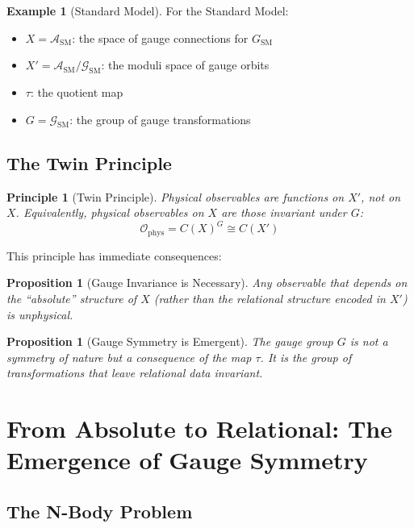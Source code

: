 \documentclass[11pt,a4paper,openright]{book}
\theoremstyle{plain}
\newtheorem{proposition}[theorem]{Proposition}
\newtheorem{principle}[theorem]{Principle}
\theoremstyle{definition}
\newtheorem{example}[theorem]{Example}
\newcommand{\SM}{\mathrm{SM}}
\begin{document}
\begin{example}[Standard Model]
For the Standard Model:
\begin{itemize}
    \item $X = \mathcal{A}_{\SM}$: the space of gauge connections for $G_{\SM}$
    \item $X' = \mathcal{A}_{\SM}/\mathcal{G}_{\SM}$: the moduli space of gauge orbits
    \item $\tau$: the quotient map
    \item $G = \mathcal{G}_{\SM}$: the group of gauge transformations
\end{itemize}
\end{example}

\subsection{The Twin Principle}

\begin{principle}[Twin Principle]
\label{prin:twin}
Physical observables are functions on $X'$, not on $X$. Equivalently, physical observables on $X$ are those invariant under $G$:
\begin{equation}
\mathcal{O}_{\mathrm{phys}} = C(X)^G \cong C(X')
\end{equation}
\end{principle}

This principle has immediate consequences:

\begin{proposition}[Gauge Invariance is Necessary]
Any observable that depends on the ``absolute'' structure of $X$ (rather than the relational structure encoded in $X'$) is unphysical.
\end{proposition}

\begin{proposition}[Gauge Symmetry is Emergent]
The gauge group $G$ is not a symmetry of nature but a consequence of the map $\tau$. It is the group of transformations that leave relational data invariant.
\end{proposition}

\section{From Absolute to Relational: The Emergence of Gauge Symmetry}

\subsection{The N-Body Problem}
\end{document}
